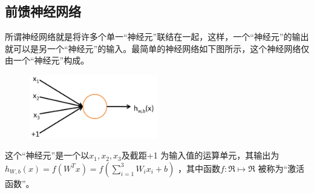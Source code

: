 \documentclass[UTF8]{ctexart}
\begin{document}
\subsection{前馈神经网络}
	所谓神经网络就是将许多个单一“神经元”联结在一起，这样，一个“神经元”的输出就可以是另一个“神经元”的输入。最简单的神经网络如下图所示，这个神经网络仅由一个“神经元”构成。
	\begin{figure}[H]
		\centering 
		\includegraphics[width=0.5\textwidth]{SingleNeuron}
	\end{figure}
	这个“神经元”是一个以$x_1, x_2, x_3$及截距+1 为输入值的运算单元，其输出为 $h_{W,b}(x) = f(W^Tx) = f(\sum_{i=1}^3 W_{i}x_i +b)$ ，其中函数$f : \Re \mapsto \Re$ 被称为“激活函数”。
	
\end{document}
